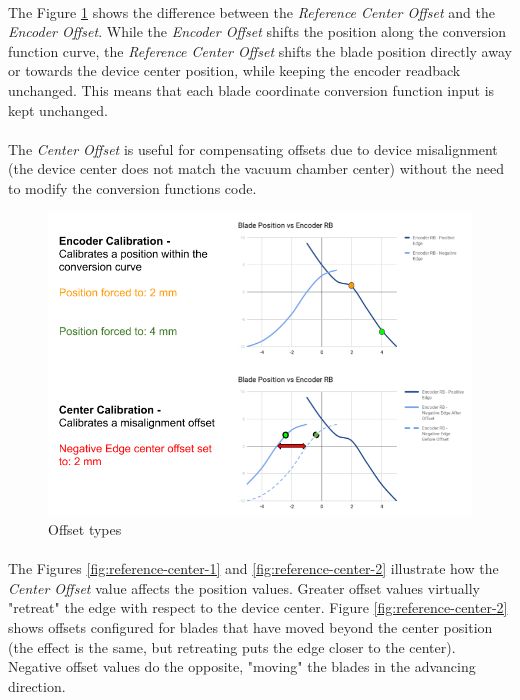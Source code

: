 \documentclass[openany]{article}
\begin{document}
    \paragraph{} The Figure \ref{fig:offset-cal} shows the difference between the \emph{Reference Center Offset} and the \emph{Encoder Offset}. While the \emph{Encoder Offset} shifts the position along the conversion function curve, the \emph{Reference Center Offset} shifts the blade position directly away or towards the device center position, while keeping the encoder readback unchanged. This means that each blade coordinate conversion function input is kept unchanged.

    \paragraph{} The \emph{Center Offset} is useful for compensating offsets due to device misalignment (the device center does not match the vacuum chamber center) without the need to modify the conversion functions code.

    \begin{figure}[!h]
        \caption{Offset types}
        \label{fig:offset-cal}
        \centering
        \includegraphics[width=1.0\textwidth]{diff_ctrl_offset_cal}
    \end{figure}
    \FloatBarrier

    \paragraph{} The Figures \ref{fig:reference-center-1} and \ref{fig:reference-center-2} illustrate how the \emph{Center Offset} value affects the position values. Greater offset values virtually "retreat" the edge with respect to the device center. Figure \ref{fig:reference-center-2} shows offsets configured for blades that have moved beyond the center position (the effect is the same, but retreating puts the edge closer to the center). Negative offset values do the opposite, "moving" the blades in the advancing direction.
\end{document}
